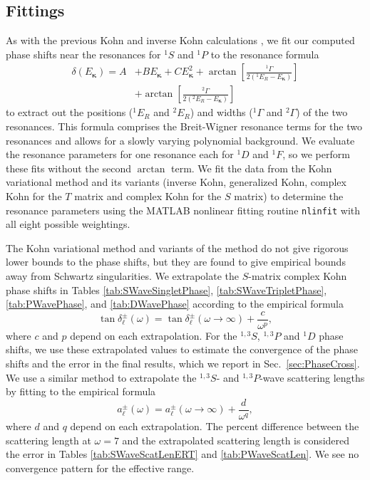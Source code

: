 \documentclass[preprint,showpacs,showkeys,preprintnumbers,amsmath,amssymb,longbibliography,pra,aps]{revtex4-1}
\begin{document}
{\subsection{Fittings}
As with the previous Kohn and inverse Kohn calculations
\cite{VanReeth2004},
we fit our computed phase shifts near the resonances for
$^1S$ and $^1P$ to the resonance formula
\begin{align}
\label{eq:ResonanceFit}
\delta(E_{\bm \kappa}) = A &+ B E_{\bm \kappa} + C E_{\bm \kappa}^2 + \arctan
  \left[ \frac{^1\Gamma}{2(^1E_R - E_{\bm \kappa})} \right]  \nonumber \\
& + \arctan \left[ \frac{^2\Gamma}{2(^2E_R - E_{\bm \kappa})} \right]
\end{align}
to extract out the positions ($^1E_R$ and $^2E_R$) and widths ($^1\Gamma$ and 
$^2\Gamma$) of the two resonances. This formula comprises the
Breit-Wigner resonance terms
\cite{VanReeth2004,Breit1936,Macek1970,Hazi1979} for the two
resonances and allows for a slowly varying polynomial background.
We evaluate the resonance parameters for one resonance each for $^1D$ and
$^1F$, so we perform these fits without the second $\arctan$ term.
We fit the data from the Kohn variational method and its variants
(inverse Kohn, generalized Kohn, complex Kohn for the $T$ 
matrix and complex Kohn for the $S$ matrix) to determine the resonance
parameters
using the MATLAB \cite{MATLAB} nonlinear fitting routine 
\texttt{nlinfit} with all eight possible weightings.

The Kohn variational method and variants of the method do not give 
rigorous lower bounds to the phase shifts, but they are found to give 
empirical bounds away from Schwartz singularities. We extrapolate
the $S$-matrix complex Kohn phase
shifts in Tables \ref{tab:SWaveSingletPhase}, \ref{tab:SWaveTripletPhase},
\ref{tab:PWavePhase}, and \ref{tab:DWavePhase} according to the 
empirical formula \cite{Armour1991,VanReeth2003}
\begin{equation}
\label{eq:Extrap}
\tan\delta_\ell^\pm(\omega) = \tan\delta_\ell^\pm(\omega\to\infty) +
  \frac{c}{\omega^p},
\end{equation}
where $c$ and $p$ depend on each extrapolation.
For the $^{1,3}S$, $^{1,3}P$ and $^1D$ phase shifts,
we use these extrapolated values to estimate the convergence of the phase 
shifts and the error in the final results, which we report in
Sec.~\ref{sec:PhaseCross}. We use a similar method to
extrapolate the $^{1,3}S$- and $^{1,3}P$-wave scattering lengths by
fitting to the empirical formula \cite{VanReeth2003}
\begin{equation}
\label{eq:ExtrapA}
a_\ell^\pm(\omega) = a_\ell^\pm(\omega\to\infty) + \frac{d}{\omega^q},
\end{equation}
where $d$ and $q$ depend on each extrapolation.
The percent difference between the scattering length at $\omega = 7$
and the extrapolated scattering 
length is considered the error in Tables \ref{tab:SWaveScatLenERT} and
\ref{tab:PWaveScatLen}. We see no convergence pattern for the effective range.

}
\end{document}
